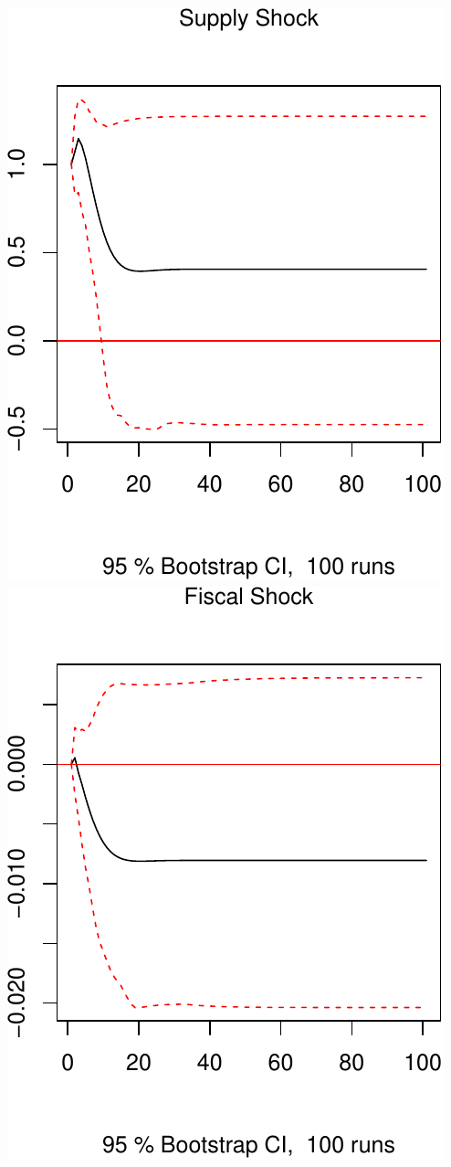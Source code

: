 \documentclass[11pt,preprint, authoryear]{elsarticle}
\numberwithin{equation}{section}
\numberwithin{figure}{section}
\numberwithin{table}{section}
\begin{document}
\includegraphics{TS_proj_files/figure-latex/unnamed-chunk-45-1.pdf}
\includegraphics{TS_proj_files/figure-latex/unnamed-chunk-45-2.pdf}
\end{document}
